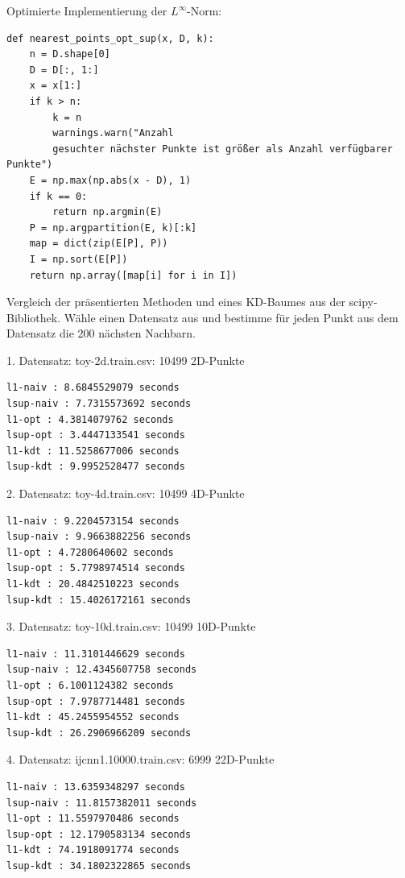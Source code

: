 \documentclass{beamer}
\begin{document}
\begin{frame}[fragile]
Optimierte Implementierung der $L^{\infty}$-Norm:
\begin{verbatim}
def nearest_points_opt_sup(x, D, k):
    n = D.shape[0]
    D = D[:, 1:]
    x = x[1:]
    if k > n:
        k = n 
        warnings.warn("Anzahl 
        gesuchter nächster Punkte ist größer als Anzahl verfügbarer Punkte")
    E = np.max(np.abs(x - D), 1)
    if k == 0:
        return np.argmin(E)
    P = np.argpartition(E, k)[:k]
    map = dict(zip(E[P], P))
    I = np.sort(E[P])
    return np.array([map[i] for i in I])
\end{verbatim}
\end{frame}

\begin{frame}
Vergleich der präsentierten Methoden und eines KD-Baumes aus der scipy-Bibliothek.
Wähle einen Datensatz aus und bestimme für jeden Punkt aus dem Datensatz die 200 nächsten Nachbarn.
\end{frame}

\begin{frame}[fragile]
1. Datensatz: toy-2d.train.csv: 10499 2D-Punkte
\begin{verbatim}
l1-naiv : 8.6845529079 seconds
lsup-naiv : 7.7315573692 seconds
l1-opt : 4.3814079762 seconds
lsup-opt : 3.4447133541 seconds
l1-kdt : 11.5258677006 seconds
lsup-kdt : 9.9952528477 seconds
\end{verbatim}
\end{frame}

\begin{frame}[fragile]
2. Datensatz: toy-4d.train.csv: 10499 4D-Punkte
\begin{verbatim}
l1-naiv : 9.2204573154 seconds
lsup-naiv : 9.9663882256 seconds
l1-opt : 4.7280640602 seconds
lsup-opt : 5.7798974514 seconds
l1-kdt : 20.4842510223 seconds
lsup-kdt : 15.4026172161 seconds
\end{verbatim}
\end{frame}

\begin{frame}[fragile]
3. Datensatz: toy-10d.train.csv: 10499 10D-Punkte
\begin{verbatim}
l1-naiv : 11.3101446629 seconds
lsup-naiv : 12.4345607758 seconds
l1-opt : 6.1001124382 seconds
lsup-opt : 7.9787714481 seconds
l1-kdt : 45.2455954552 seconds
lsup-kdt : 26.2906966209 seconds
\end{verbatim}
\end{frame}

\begin{frame}[fragile]
4. Datensatz: ijcnn1.10000.train.csv: 6999 
22D-Punkte
\begin{verbatim}
l1-naiv : 13.6359348297 seconds
lsup-naiv : 11.8157382011 seconds
l1-opt : 11.5597970486 seconds
lsup-opt : 12.1790583134 seconds
l1-kdt : 74.1918091774 seconds
lsup-kdt : 34.1802322865 seconds
\end{verbatim}
\end{frame}
\end{document}

